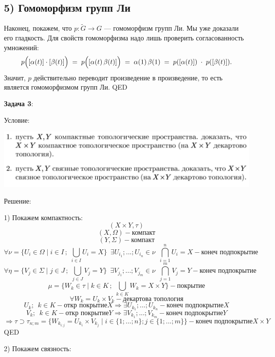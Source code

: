 \documentclass[12pt]{article}
\begin{document}
\begin{large}
\subsection*{5) Гомоморфизм групп Ли}
Наконец, покажем, что $p \colon \widetilde{G} \to G$ --- гомоморфизм групп Ли. Мы уже доказали его гладкость. Для свойств гомоморфизма надо лишь проверить согласованность умножений:
\[
p\Bigl([\alpha(t)] \cdot [\beta(t)]\Bigr) \;=\; p\Bigl([\alpha(t)\,\beta(t)]\Bigr)
\;=\; \alpha(1)\,\beta(1)
\;=\; p([\alpha(t)])\;\cdot\;p([\beta(t)]).
\]
Значит, $p$ действительно переводит произведение в произведение, то есть является гомоморфизмом групп Ли. QED

\par \textbf{Задача 3}:
\par Условие:
\par
\includegraphics[width=1\textwidth]{photo_3.png}
\par Решение:
\par 1) Покажем компактность:
\[
    (X \times Y, \tau)
\]
\[
    (X, \Omega) - \text{компакт}
\]
\[
    (Y, \varSigma) - \text{компакт}
\]
\[
    \forall \nu = \{ U_i \in \Omega \mid i \in I \, ; \, \, \bigcup\limits_{i \in I} U_i = X \} \, \, \, \exists U_{i_1}; ...; U_{i_n} \in \nu \, \, \, \bigcap\limits_{i = 1}^n U_i = X - \text{конеч подпокрытие}
\]
\[
    \forall \eta = \{ V_j \in \varSigma \mid j \in J \, ; \, \, \bigcup\limits_{j \in J} V_j = Y \} \, \, \, \exists V_{j_1}; ...; V_{j_m} \in \nu \, \, \, \bigcap\limits_{j = 1}^m V_j = Y - \text{конеч подпокрытие}
\]
\[
    \mu = \{ W_k \in \tau \mid k \in K \, ; \, \, \bigcup\limits_{k \in K} W_k = X \times Y \} - \text{покрытие}
\]
\[
    \forall W_k = U_k \times V_k - \text{декартова топология}
\]
\[
    U_k; \,\,\, k \in K - \text{откр покрытие} X \Rightarrow \exists U_{k_1}; ...; U_{k_n} - \text{конеч подпокрытие} X
\]
\[
    V_k; \,\,\, k \in K - \text{откр покрытие} Y \Rightarrow \exists V_{k_1}; ...; V_{k_m} - \text{конеч подпокрытие} Y
\]
\[
    \Rightarrow \tau \supset \tau_{n;m} = \{ W_{k_{i; j}} = U_{k_i} \times V_{k_j} \mid i \in \{1; ...; n\}; j \in \{1; ...; m\} \} - \text{конеч подпокрытие} X \times Y
\]
QED
\par 2) Покажем связность:

\end{large}
\end{document}
